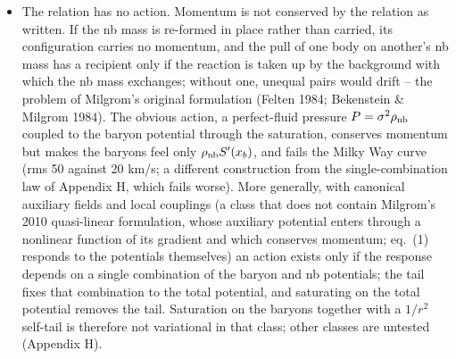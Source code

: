 \documentclass[
  10pt,
]{article}
\begin{document}
\begin{itemize}
\item The relation has no action. Momentum is not conserved by the relation as written. If the nb mass is re-formed in place rather than carried, its configuration carries no momentum, and the pull of one body on another's nb mass has a recipient only if the reaction is taken up by the background with which the nb mass exchanges; without one, unequal pairs would drift -- the problem of Milgrom's original formulation (Felten 1984; Bekenstein \& Milgrom 1984). The obvious action, a perfect-fluid pressure $P=\sigma^2\rho_{\rm nb}$ coupled to the baryon potential through the saturation, conserves momentum but makes the baryons feel only $\rho_{\rm nb}S'(x_b)$, and fails the Milky Way curve (rms 50 against 20 km/s; a different construction from the single-combination law of Appendix H, which fails worse). More generally, with canonical auxiliary fields and local couplings (a class that does not contain Milgrom's 2010 quasi-linear formulation, whose auxiliary potential enters through a nonlinear function of its gradient and which conserves momentum; eq.~(1) responds to the potentials themselves) an action exists only if the response depends on a single combination of the baryon and nb potentials; the tail fixes that combination to the total potential, and saturating on the total potential removes the tail. Saturation on the baryons together with a $1/r^2$ self-tail is therefore not variational in that class; other classes are untested (Appendix H).

\end{itemize}
\end{document}
